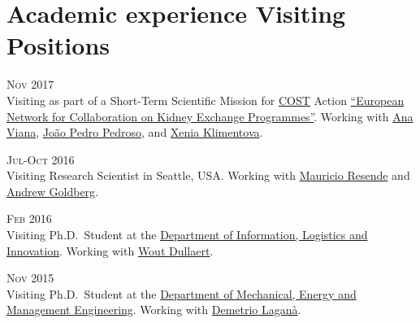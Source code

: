 \section*{Academic experience {\small Visiting Positions}}

\begin{paracol}{2}
  \textsc{Nov 2017}
\switchcolumn
  \\
  Visiting as part of a Short-Term Scientific Mission for \href{http://www.cost.eu/}{COST} Action \href{http://www.enckep-cost.eu/}{``European Network for Collaboration on Kidney Exchange Programmes''}.
  Working with \href{https://scholar.google.com/citations?user=RW7QevYAAAAJ}{Ana Viana}, \href{https://scholar.google.it/citations?user=aWTZf_AAAAAJ}{João Pedro Pedroso}, and \href{http://orcid.org/0000-0003-1085-0810}{Xenia Klimentova}.
\end{paracol}

\begin{paracol}{2}
  \textsc{Jul-Oct 2016}
\switchcolumn
  \\
  Visiting Research Scientist in Seattle, USA. Working with \href{https://scholar.google.com/citations?user=KTmPx50AAAAJ}{Mauricio Resende} and \href{https://scholar.google.it/citations?user=U5iFVowAAAAJ}{Andrew Goldberg}.
\end{paracol}

\begin{paracol}{2}
  \textsc{Feb 2016}
\switchcolumn
  \\
  Visiting Ph.D.\ Student at the \href{https://sbe.vu.nl/en/departments-and-institutes/information-logistics-and-innovation/index.aspx}{Department of Information, Logistics and Innovation}. Working with \href{https://scholar.google.com/citations?user=wjjCd5UAAAAJ}{Wout Dullaert}.
\end{paracol}

\begin{paracol}{2}
  \textsc{Nov 2015}
\switchcolumn
  \\
  Visiting Ph.D.\ Student at the \href{http://www.unical.it/portale/strutture/dipartimenti_240/dimeg/}{Department of Mechanical, Energy and Management Engineering}. Working with \href{https://scholar.google.com/citations?user=r_qFOqgAAAAJ}{Demetrio Laganà}.
\end{paracol}

